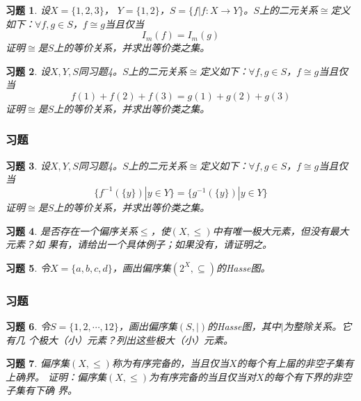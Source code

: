 \documentclass{beamer}
\newtheorem*{Exercise}{习题}
\begin{document}
\begin{CJK*}{UTF8}{gbsn}
\begin{frame}
  \begin{Exercise}
  设$X = \{1,2,3\}$， $Y = \{1,2\}$，$S = \{f|f:X \to Y\}$。$S$上的二元关系$\cong$定义如下：$\forall f,g\in S$，$f \cong g$当且仅当\[I_m(f) = I_m(g)\]证明$\cong$是$S$上的等价关系，并求出等价类之集。    
  \end{Exercise}
  \begin{Exercise}
  设$X, Y, S$同习题4。$S$上的二元关系$\cong$定义如下：$\forall f,g\in S$，$f \cong g$当且仅当\[f(1) + f(2) + f(3) = g(1) + g(2) + g(3)\]证明$\cong$是$S$上的等价关系，并求出等价类之集。    
  \end{Exercise}

\end{frame}

\begin{frame}
  \frametitle{习题}
 \begin{Exercise}
  设$X, Y, S$同习题4。$S$上的二元关系$\cong$定义如下：$\forall f,g\in S$，$f \cong g$当且仅当\[\{f^{-1}(\{y\}) | y \in Y\} = \{g^{-1}(\{y\})|y \in Y\}\]证明$\cong$是$S$上的等价关系，并求出等价类之集。  
  \end{Exercise}
  \begin{Exercise}
    是否存在一个偏序关系$\leq$，使$(X,\leq)$中有唯一极大元素，但没有最大元素？如
    果有，请给出一个具体例子；如果没有，请证明之。
  \end{Exercise}
  \begin{Exercise}
    令$X=\{a,b,c,d\}$，画出偏序集$(2^X,\subseteq)$的Hasse图。
  \end{Exercise}
\end{frame}
\begin{frame}
  \frametitle{习题}
 \begin{Exercise}
 令$S=\{1,2,\cdots,12\}$，画出偏序集$(S,|)$的Hasse图，其中$|$为整除关系。它有几
 个极大（小）元素？列出这些极大（小）元素。
  \end{Exercise}
  \begin{Exercise}
    偏序集$(X,\leq)$称为有序完备的，当且仅当$X$的每个有上届的非空子集有上确界。
    证明：偏序集$(X,\leq)$为有序完备的当且仅当对$X$的每个有下界的非空子集有下确
    界。
  \end{Exercise}
\end{frame}

\end{CJK*}
\end{document}

